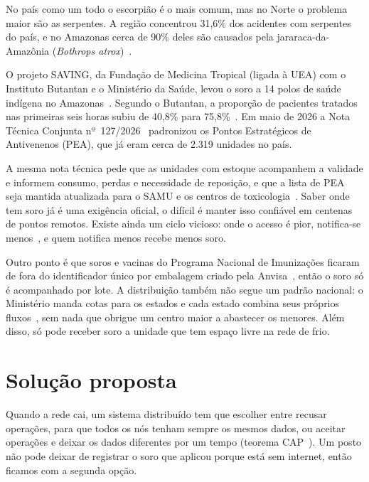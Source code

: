 \documentclass[a4paper,12pt]{article}
\begin{document}
No país como um todo o escorpião é o mais comum, mas no Norte o problema maior
são as serpentes. A região concentrou 31,6\% dos acidentes com serpentes do
país, e no Amazonas cerca de 90\% deles são causados pela jararaca-da-Amazônia
(\emph{Bothrops atrox})~\cite{diversitas2022}.

O projeto SAVING, da Fundação de Medicina Tropical (ligada à UEA) com o
Instituto Butantan e o Ministério da Saúde, levou o soro a 14 polos de saúde
indígena no Amazonas~\cite{farias2025}. Segundo o Butantan, a proporção de
pacientes tratados nas primeiras seis horas subiu de 40,8\% para
75,8\%~\cite{butantan40mi}. Em maio de 2026 a Nota Técnica Conjunta
nº~127/2026~\cite{nt127} padronizou os Pontos Estratégicos de Antivenenos
(PEA), que já eram cerca de 2.319 unidades no país.

A mesma nota técnica pede que as unidades com estoque acompanhem a validade e
informem consumo, perdas e necessidade de reposição, e que a lista de PEA seja
mantida atualizada para o SAMU e os centros de toxicologia~\cite{nt127}. Saber
onde tem soro já é uma exigência oficial, o difícil é manter isso confiável em
centenas de pontos remotos. Existe ainda um ciclo vicioso: onde o acesso é
pior, notifica-se menos~\cite{completude2023}, e quem notifica menos recebe
menos soro.

Outro ponto é que soros e vacinas do Programa Nacional de Imunizações ficaram
de fora do identificador único por embalagem criado pela Anvisa~\cite{rdc157},
então o soro só é acompanhado por lote. A distribuição também não segue um
padrão nacional: o Ministério manda cotas para os estados e cada estado
combina seus próprios fluxos~\cite{nt127}, sem nada que obrigue um centro maior
a abastecer os menores. Além disso, só pode receber soro a unidade que tem
espaço livre na rede de frio.

\section{Solução proposta}
\label{sec:solucao}

Quando a rede cai, um sistema distribuído tem que escolher entre recusar
operações, para que todos os nós tenham sempre os mesmos dados, ou aceitar
operações e deixar os dados diferentes por um tempo (teorema
CAP~\cite{gilbert2002}). Um posto não pode deixar de registrar o soro que
aplicou porque está sem internet, então ficamos com a segunda opção.
\end{document}
